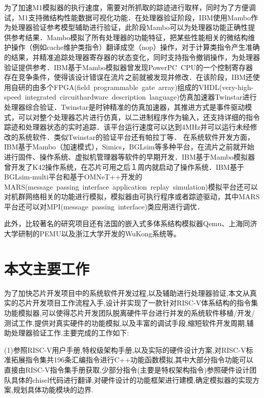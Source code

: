 为了加速M1模拟器的执行速度，需要对所抓取的踪迹进行取样，同时为了方便调试，M1支持微结构性能数据可视化功能．在处理器验证阶段，IBM使用Mambo作为处理器验证参考模型辅助进行验证，此阶段Mambo可以为处理器功能正确性提供参考结果．Mambo模拟了所有处理器的功能特征，把某些性能相关的微结构维护操作（例如cache维护类指令）翻译成空（nop）操作，对于计算类指令产生准确的结果，并精准追踪处理器寄存器的状态变化，同时支持指令撤销操作，为处理器验证提供参考．IBM基于Mambo模拟器曾发现PowerPC CPU的一个控制寄存器存在竞争条件，使得该设计错误在流片之前就被发现并修改．在该阶段，IBM还使用自研的由多个FPGA(field programmable gate array)组成的VHDL(very-high-speed integrated circuithardware description language)仿真加速器Twinstar\cite{asaad2012cycle}进行处理器综合验证．Twinstar是时钟精准的仿真加速器，其推进方式是事件驱动模式，可以对整个处理器芯片进行仿真，以二进制程序作为输入，还支持详细的指令踪迹和处理器状态的实时追踪．该平台运行速度可以达到4MHz并可以运行未经修改的系统软件．类似Twinstar的验证平台还有帕拉丁\cite{chaix2019implementation}等．
在系统软件开发方面，IBM基于Mambo（加速模式），Simics\cite{magnusson2002simics}，BGLsim\cite{ceze2003full}等多种平台，在流片之前就开始进行固件、操作系统、虚拟机管理器等软件的早期开发．IBM基于Mambo模拟器曾开发了K42操作系统，在芯片可用之后１周内就启动了操作系统\cite{boh}．IBM基于BGLsim-multi\cite{ceze2003full}平台和基于OMNeT++\cite{varga2010omnet}开发的MARS(message passing interface application replay simulation)模拟平台还可以对机群网络相关的功能进行模拟，模拟器由可执行程序或者踪迹驱动，其中MARS平台还可以对MPI(message passing interface)类应用进行调优．


此外，比较著名的研究项目还有法国的嵌入式多体系结构模拟器Qemu\cite{bellard2005qemu}、上海同济大学研制的PEMU\cite{huang}以及浙江大学开发的WuKong系统\cite{wukong}等。


\section{本文主要工作}
为了加快芯片开发项目中的系统软件开发过程,以及辅助进行处理器验证,本文从真实的芯片开发项目工作流程入手,设计并实现了一款针对RISC-V体系结构的指令集功能模拟器,可以使得芯片开发团队脱离硬件平台进行并发的系统软件移植/开发/测试工作,提供对真实硬件的功能模拟,以及丰富的调试手段,缩短软件开发周期,辅助处理器验证工作.主要完成的工作如下:


(1)参照RISC-V用户手册,特权级架构手册,以及实际的硬件设计方案,对RISC-V标准拓展指令集共196条汇编指令进行C++功能函数模拟,其中大部分指令功能可以直接由RISC-V指令集手册获取,少部分指令(主要是特权架构指令)参照硬件设计团队具体的chisel代码进行翻译,对硬件设计的功能框架进行建模,确定模拟器的实现方案,规划具体功能模块的边界.



